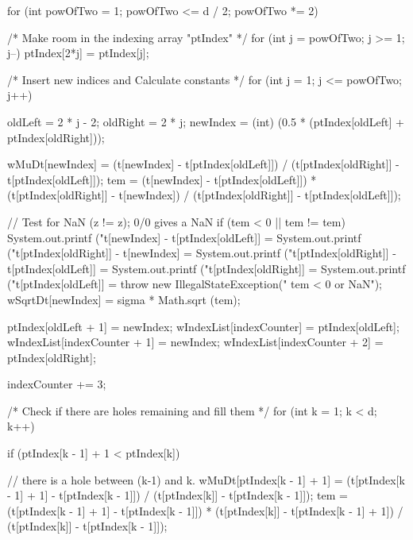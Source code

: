 \begin{code}
\begin{hide}
{      for (int powOfTwo = 1; powOfTwo <= d / 2; powOfTwo *= 2) {
         /* Make room in the indexing array "ptIndex" */
         for (int j = powOfTwo; j >= 1; j--) {
            ptIndex[2*j] = ptIndex[j];
         }

         /* Insert new indices and Calculate constants */
         for (int j = 1; j <= powOfTwo; j++) {
            oldLeft = 2 * j - 2;
            oldRight = 2 * j;
            newIndex = (int) (0.5 * (ptIndex[oldLeft] + ptIndex[oldRight]));

            wMuDt[newIndex] = (t[newIndex] - t[ptIndex[oldLeft]]) /
                              (t[ptIndex[oldRight]] - t[ptIndex[oldLeft]]);
            tem = (t[newIndex] - t[ptIndex[oldLeft]]) *
                  (t[ptIndex[oldRight]] - t[newIndex])
                  / (t[ptIndex[oldRight]] - t[ptIndex[oldLeft]]);

            // Test for NaN (z != z); 0/0 gives a NaN
            if (tem < 0 || tem != tem) {
               System.out.printf ("t[newIndex] - t[ptIndex[oldLeft]] = %
               System.out.printf ("t[ptIndex[oldRight]] - t[newIndex] = %
               System.out.printf ("t[ptIndex[oldRight]] - t[ptIndex[oldLeft]] = %
               System.out.printf ("t[ptIndex[oldRight]] = %
               System.out.printf ("t[ptIndex[oldLeft]] = %
               throw new IllegalStateException("   tem < 0 or NaN");
            }
            wSqrtDt[newIndex] = sigma * Math.sqrt (tem);

            ptIndex[oldLeft + 1] = newIndex;
            wIndexList[indexCounter] = ptIndex[oldLeft];
            wIndexList[indexCounter + 1] = newIndex;
            wIndexList[indexCounter + 2] = ptIndex[oldRight];

            indexCounter += 3;
         }
      }
      /* Check if there are holes remaining and fill them */
      for (int k = 1; k < d; k++) {
         if (ptIndex[k - 1] + 1 < ptIndex[k]) {
            // there is a hole between (k-1) and k.
            wMuDt[ptIndex[k - 1] + 1] = (t[ptIndex[k - 1] + 1] - t[ptIndex[k - 1]]) /
                                        (t[ptIndex[k]] - t[ptIndex[k - 1]]);
            tem = (t[ptIndex[k - 1] + 1] - t[ptIndex[k - 1]]) *
                  (t[ptIndex[k]] - t[ptIndex[k - 1] + 1])
                  / (t[ptIndex[k]] - t[ptIndex[k - 1]]);

}}}
\end{hide}
\end{code}
